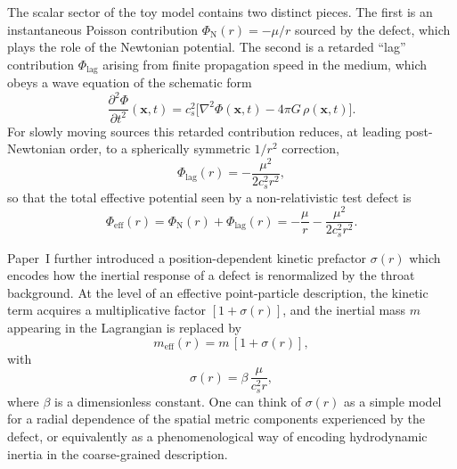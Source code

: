 \documentclass[11pt]{article}
\newcommand{\cS}{c_s}
\begin{document}
The scalar sector of the toy model contains two distinct pieces.
The first is an instantaneous Poisson contribution
$\Phi_{\mathrm{N}}(r) = -\mu/r$ sourced by the defect, which plays
the role of the Newtonian potential.
The second is a retarded ``lag'' contribution $\Phi_{\mathrm{lag}}$
arising from finite propagation speed in the medium, which obeys a
wave equation of the schematic form
\begin{equation}
  \frac{\partial^2 \Phi}{\partial t^2}(\mathbf{x},t)
  = \cS^2 \bigl[\nabla^2 \Phi(\mathbf{x},t) - 4\pi G\,\rho(\mathbf{x},t)\bigr].
\end{equation}
For slowly moving sources this retarded contribution reduces, at
leading post-Newtonian order, to a spherically symmetric $1/r^2$
correction,
\begin{equation}
  \Phi_{\mathrm{lag}}(r)
  = -\frac{\mu^2}{2 \cS^2 r^2},
\end{equation}
so that the total effective potential seen by a non-relativistic
test defect is
\begin{equation}
  \Phi_{\mathrm{eff}}(r)
  = \Phi_{\mathrm{N}}(r) + \Phi_{\mathrm{lag}}(r)
  = -\frac{\mu}{r} - \frac{\mu^2}{2 \cS^2 r^2}.
  \label{eq:Phi-eff-paper1}
\end{equation}

Paper~I further introduced a position-dependent kinetic prefactor
$\sigma(r)$ which encodes how the inertial response of a defect is
renormalized by the throat background.
At the level of an effective point-particle description, the kinetic
term acquires a multiplicative factor $[1+\sigma(r)]$, and the
inertial mass $m$ appearing in the Lagrangian is replaced by
\begin{equation}
  m_{\mathrm{eff}}(r) = m\,[1+\sigma(r)],
\end{equation}
with
\begin{equation}
  \sigma(r) = \beta\,\frac{\mu}{\cS^2 r},
  \label{eq:sigma-paper1}
\end{equation}
where $\beta$ is a dimensionless constant.
One can think of $\sigma(r)$ as a simple model for a radial
dependence of the spatial metric components experienced by the
defect, or equivalently as a phenomenological way of encoding
hydrodynamic inertia in the coarse-grained description.
\end{document}
